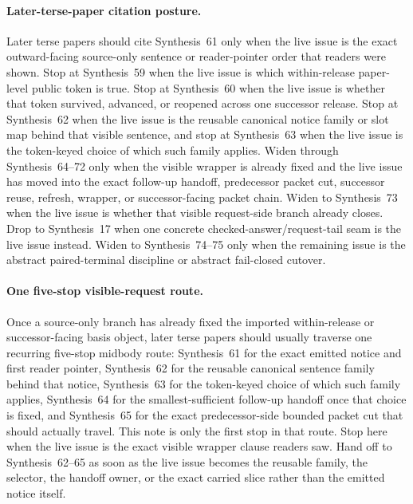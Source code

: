 \documentclass[11pt]{article}
\begin{document}
\paragraph{Later-terse-paper citation posture.}
Later terse papers should cite Synthesis~61 only when the live issue is the exact outward-facing source-only sentence or reader-pointer order that readers were shown. Stop at Synthesis~59 when the live issue is which within-release paper-level public token is true. Stop at Synthesis~60 when the live issue is whether that token survived, advanced, or reopened across one successor release. Stop at Synthesis~62 when the live issue is the reusable canonical notice family or slot map behind that visible sentence, and stop at Synthesis~63 when the live issue is the token-keyed choice of which such family applies. Widen through Synthesis~64--72 only when the visible wrapper is already fixed and the live issue has moved into the exact follow-up handoff, predecessor packet cut, successor reuse, refresh, wrapper, or successor-facing packet chain. Widen to Synthesis~73 when the live issue is whether that visible request-side branch already closes. Drop to Synthesis~17 when one concrete checked-answer/request-tail seam is the live issue instead. Widen to Synthesis~74--75 only when the remaining issue is the abstract paired-terminal discipline or abstract fail-closed cutover.\cite{series:publicrequeststatusenvelopes,series:publicrequestcarryforward,series:publicrequestnoticenormalforms,series:publicrequestnoticeselections,series:publicrequestresponsemenus,series:publicrequestresponsepackets,series:publicrequestresponsepacketcarryforward,series:publicrequestresponsepacketdeltaledgers,series:publicrequestresponsepacketrefreshnotices,series:publicrequestresponsepacketrefreshnoticenormalforms,series:publicrequestresponsepacketrefreshnoticeselections,series:publicrequestresponsepacketrefreshresponsemenus,series:publicrequestresponsepacketrefreshresponsepackets,series:publicrequestresponsepacketrefreshresponsepacketclosureverdicts,series:pairedterminalcitationdiscipline,series:pairedterminalcutoverrule,series:workedexample}


\paragraph{One five-stop visible-request route.}
Once a source-only branch has already fixed the imported within-release or successor-facing basis object, later terse papers should usually traverse one recurring five-stop midbody route: Synthesis~61 for the exact emitted notice and first reader pointer, Synthesis~62 for the reusable canonical sentence family behind that notice, Synthesis~63 for the token-keyed choice of which such family applies, Synthesis~64 for the smallest-sufficient follow-up handoff once that choice is fixed, and Synthesis~65 for the exact predecessor-side bounded packet cut that should actually travel. This note is only the first stop in that route. Stop here when the live issue is the exact visible wrapper clause readers saw. Hand off to Synthesis~62--65 as soon as the live issue becomes the reusable family, the selector, the handoff owner, or the exact carried slice rather than the emitted notice itself.
\end{document}
